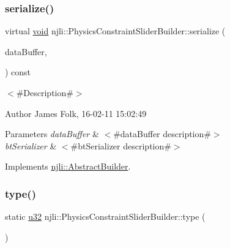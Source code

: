 \subsubsection{\texorpdfstring{serialize()}{serialize()}}
{\footnotesize\ttfamily virtual \mbox{\hyperlink{_thread_8h_af1e856da2e658414cb2456cb6f7ebc66}{void}} njli\+::\+Physics\+Constraint\+Slider\+Builder\+::serialize (\begin{DoxyParamCaption}\item[{\mbox{\hyperlink{_thread_8h_af1e856da2e658414cb2456cb6f7ebc66}{void}} $\ast$}]{data\+Buffer,  }\item[{bt\+Serializer $\ast$}]{ }\end{DoxyParamCaption}) const\hspace{0.3cm}{\ttfamily [virtual]}}



$<$\#\+Description\#$>$ 

\begin{DoxyAuthor}{Author}
James Folk, 16-\/02-\/11 15\+:02\+:49
\end{DoxyAuthor}

\begin{DoxyParams}{Parameters}
{\em data\+Buffer} & $<$\#data\+Buffer description\#$>$ \\
\hline
{\em bt\+Serializer} & $<$\#bt\+Serializer description\#$>$ \\
\hline
\end{DoxyParams}


Implements \mbox{\hyperlink{classnjli_1_1_abstract_builder_ab66b774e02ccb9da554c9aab7fa6d981}{njli\+::\+Abstract\+Builder}}.

\mbox{\label{classnjli_1_1_physics_constraint_slider_builder_aede51b8778aef72bf1134f8693a773b0}} 
\subsubsection{\texorpdfstring{type()}{type()}}
{\footnotesize\ttfamily static \mbox{\hyperlink{_util_8h_a10e94b422ef0c20dcdec20d31a1f5049}{u32}} njli\+::\+Physics\+Constraint\+Slider\+Builder\+::type (\begin{DoxyParamCaption}{ }\end{DoxyParamCaption})\hspace{0.3cm}{\ttfamily [static]}}

